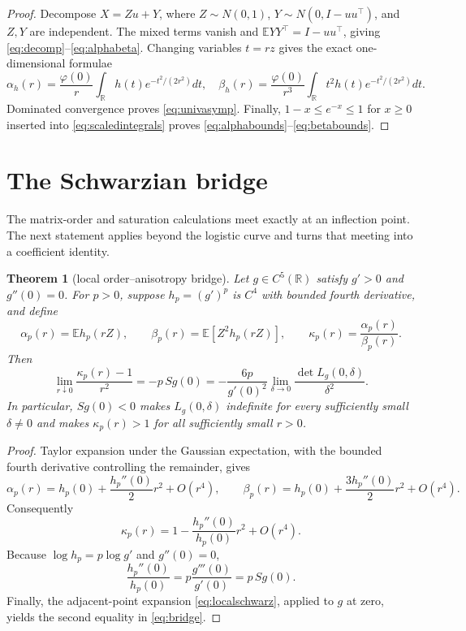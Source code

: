 \documentclass[11pt]{article}
\newtheorem{theorem}{Theorem}[section]
\newcommand{\E}{\mathbb E}
\newcommand{\R}{\mathbb R}
\begin{document}
\begin{proof}
Decompose $X=Zu+Y$, where $Z\sim N(0,1)$, $Y\sim N(0,I-uu^\top)$, and $Z,Y$ are independent.
The mixed terms vanish and $\E YY^\top=I-uu^\top$, giving \eqref{eq:decomp}--\eqref{eq:alphabeta}.
Changing variables $t=rz$ gives the exact one-dimensional formulae
\begin{equation}
 \alpha_h(r)=\frac{\varphi(0)}r\int_\R h(t)e^{-t^2/(2r^2)}dt,
 \quad
 \beta_h(r)=\frac{\varphi(0)}{r^3}\int_\R t^2h(t)e^{-t^2/(2r^2)}dt.
 \label{eq:scaledintegrals}
\end{equation}
Dominated convergence proves \eqref{eq:univasymp}.  Finally,
$1-x\le e^{-x}\le1$ for $x\ge0$ inserted into \eqref{eq:scaledintegrals} proves
\eqref{eq:alphabounds}--\eqref{eq:betabounds}.
\end{proof}

\section{The Schwarzian bridge}

The matrix-order and saturation calculations meet exactly at an inflection point.  The next statement applies
beyond the logistic curve and turns that meeting into a coefficient identity.

\begin{theorem}[local order--anisotropy bridge]
\label{thm:bridge}
Let $g\in C^5(\R)$ satisfy $g'>0$ and $g''(0)=0$.  For $p>0$, suppose
$h_p=(g')^p$ is $C^4$ with bounded fourth derivative, and define
\[
 \alpha_p(r)=\E h_p(rZ),\qquad \beta_p(r)=\E[Z^2h_p(rZ)],\qquad
 \kappa_p(r)=\frac{\alpha_p(r)}{\beta_p(r)}.
\]
Then
\begin{equation}
 \lim_{r\downarrow0}\frac{\kappa_p(r)-1}{r^2}
 =-p\,Sg(0)
 =-\frac{6p}{g'(0)^2}
   \lim_{\delta\to0}\frac{\det L_g(0,\delta)}{\delta^2}.
 \label{eq:bridge}
\end{equation}
In particular, $Sg(0)<0$ makes $L_g(0,\delta)$ indefinite for every sufficiently small
$\delta\ne0$ and makes $\kappa_p(r)>1$ for all sufficiently small $r>0$.
\end{theorem}

\begin{proof}
Taylor expansion under the Gaussian expectation, with the bounded fourth derivative controlling the remainder,
gives
\[
 \alpha_p(r)=h_p(0)+\frac{h_p''(0)}2r^2+O(r^4),\qquad
 \beta_p(r)=h_p(0)+\frac{3h_p''(0)}2r^2+O(r^4).
\]
Consequently
\[
 \kappa_p(r)=1-\frac{h_p''(0)}{h_p(0)}r^2+O(r^4).
\]
Because $\log h_p=p\log g'$ and $g''(0)=0$,
\[
 \frac{h_p''(0)}{h_p(0)}
 =p\frac{g'''(0)}{g'(0)}
 =p\,Sg(0).
\]
Finally, the adjacent-point expansion \eqref{eq:localschwarz}, applied to $g$ at zero, yields the second equality
in \eqref{eq:bridge}.
\end{proof}
\end{document}
